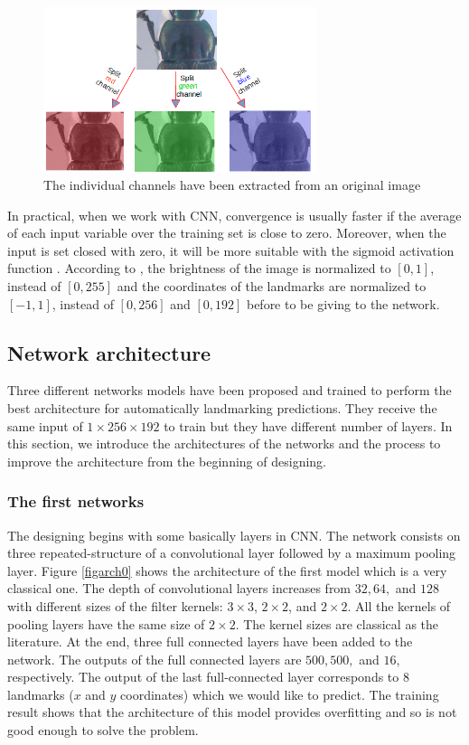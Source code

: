\documentclass{article} %
\begin{document}
\begin{multicols}{2}
\begin{figure}[H]
	\centerline{\includegraphics[height=1.9in]{images/sp_channels.png}}
	\caption{\footnotesize{The individual channels have been extracted from an original image}}
	\label{figpronotum2}
\end{figure}

In practical, when we work with CNN, convergence is usually faster if the average of each input variable over the training set is close to zero. Moreover, when the input is set closed with zero, it will be more suitable with the sigmoid activation function \cite{lecun2012efficient}. According to \cite{lecun2012efficient}, the brightness of the image is normalized to $[0,1]$, instead of $[0,255]$ and the coordinates of the landmarks are normalized to $[-1,1]$, instead of $[0,256]$ and $[0,192]$ before to be giving to the network.
\subsection{Network architecture}
\label{SecArch}
Three different networks models have been proposed and trained to perform the best architecture for automatically landmarking predictions. They receive the same input of $1 \times 256 \times 192$ to train but they have different number of layers. In this section, we introduce the architectures of the networks and the process to improve the architecture from the beginning of designing.

\subsubsection{The first networks}
The designing begins with some basically layers in CNN. The network consists on three repeated-structure of a convolutional layer followed by a maximum pooling layer. Figure \ref{figarch0} shows the architecture of the first model which is a very classical one. The depth of convolutional layers increases from $32, 64,$ and $128$ with different sizes of the filter kernels: $3 \times 3$, $2 \times 2$, and $2 \times 2$. All the kernels of pooling layers have the same size of $2 \times 2$. The kernel sizes are classical as the literature. At the end, three full connected layers have been added to the network. The outputs of the full connected layers are $500, 500,$ and $16$, respectively. The output of the last full-connected layer corresponds to 8 landmarks ($x$ and $y$ coordinates) which we would like to predict. The training result shows that the architecture of this model provides overfitting and so is not good enough to solve the problem.


\end{multicols}
\end{document}
